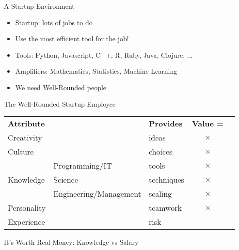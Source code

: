 \documentclass{beamer}
\begin{document}
\begin{frame}{A Startup Environment}

\begin{itemize}
  \item Startup: lots of jobs to do
  \item Use the most efficient tool for the job!
  \item Tools: Python, Javascript, C++, R, Ruby, Java, Clojure, ...
  \item Amplifiers: Mathematics, Statistics, Machine Learning
  \item We need Well-Rounded people
\end{itemize}

\end{frame}

\begin{frame}{The Well-Rounded Startup Employee}

\begin{centering}

\begin{tabular}{lllcl}
\textbf{Attribute}       &  &  \textbf{Provides}  & \textbf{Value =} & \vspace{0.5cm} \\

Creativity                 & &  ideas        & $\times$ & \\ 
Culture                    & &  choices      & $\times$ & \vspace{0.5cm} \\ 

& Programming/IT             &  tools        & $\times$ & \\
Knowledge & Science                    &  techniques   & $\times$ & \\
& Engineering/Management     &  scaling      & $\times$ & \vspace{0.5cm} \\ 

Personality                & & teamwork     & $\times$ & \\
Experience                 & & risk         &
\end{tabular}

\end{centering}

\end{frame}

\begin{frame}{It's Worth Real Money: Knowledge vs Salary}

  \begin{center}
  \end{center}

\end{frame}
\end{document}
